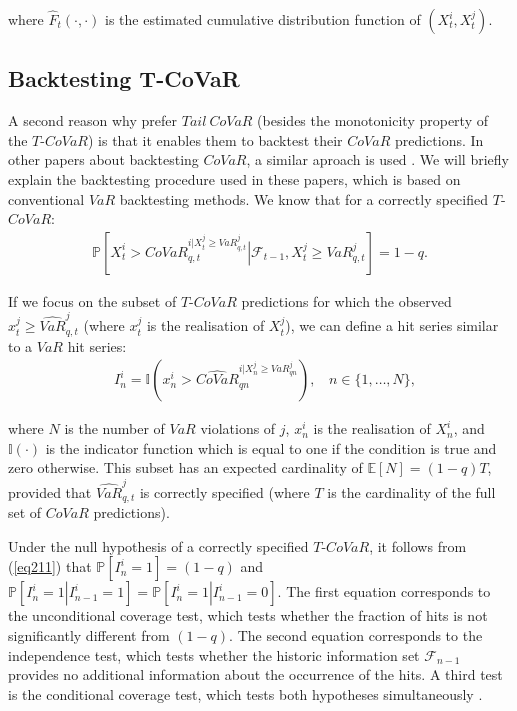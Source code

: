 \documentclass[12pt]{article}
\begin{document}
\noindent where $\widehat{F}_t\left(\cdot,\cdot\right)$ is the estimated cumulative distribution function of $(X^i_t,X^j_t)$.



\subsection{Backtesting T-CoVaR} \label{backineq}

A second reason why \citet{girardi} prefer $Tail\ CoVaR$ (besides the monotonicity property of the $T$-$CoVaR$) is that it enables them to backtest their $CoVaR$ predictions. In other papers about backtesting $CoVaR$, a similar aproach is used \citep{copulas,mesbacktest}. We will briefly explain the backtesting procedure used in these papers, which is based on conventional $VaR$ backtesting methods. We know that for a correctly specified $T$-$CoVaR$:
\begin{align}
\mathbb{P}\left[X^{i}_t>CoVaR_{q,t}^{i|X^{j}_t\geq VaR_{q,t}^{j}}\left|\mathcal{F}_{t-1},X^{j}_t\geq VaR_{q,t}^{j}\right.\right]=1-q  . \label{eq211}
\end{align}

\noindent If we focus on the subset of $T$-$CoVaR$ predictions for which the observed  $x^{j}_t\geq \widehat{VaR}_{q,t}^{j}$ (where $x^j_t$ is the realisation of $X^j_t$), we can define a hit series similar to a $VaR$ hit series:
\begin{align}
& I^i_n=\mathbb{I}\left(x^{i}_n>\widehat{CoVaR}_{qn}^{i|X^{j}_n\geq VaR_{qn}^{j}}\right), \ \ \ \ n\in \{1,\ldots,N\}, \label{Idef}
\end{align}

\noindent where $N$ is the number of $VaR$ violations of $j$, $x^{i}_n$ is the realisation of $X^{i}_n$, and $\mathbb{I}\left(\cdot\right)$ is the indicator function which is equal to one if the condition is true and zero otherwise. This subset has an expected cardinality of $\mathbb{E}\left[N\right]=(1-q) T$, provided that $\widehat{VaR}^j_{q,t}$ is correctly specified (where $T$ is the cardinality of the full set of $CoVaR$ predictions).

Under the null hypothesis of a correctly specified $T$-$CoVaR$, it follows from (\ref{eq211}) that $\mathbb{P}\left[I^i_n=1 \right]=(1-q)$ and $\mathbb{P}\left[I^i_n=1 \left| I^i_{n-1}=1\right.\right]=\mathbb{P}\left[I^i_n=1 \left| I^i_{n-1}=0\right.\right]$. The first equation corresponds to the unconditional coverage test, which tests whether the fraction of hits is not significantly different from $(1-q)$. The second equation corresponds to the independence test, which tests whether the historic information set $\mathcal{F}_{n-1}$ provides no additional information about the occurrence of the hits. A third test is the conditional coverage test, which tests both hypotheses simultaneously \citep{christoffersen}.
\end{document}
